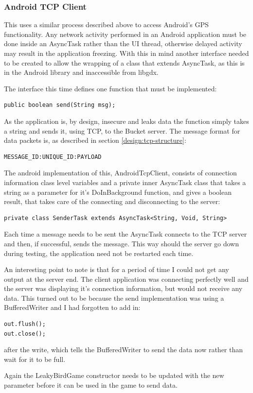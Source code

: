 \subsubsection{Android TCP Client}
This uses a similar process described above to access Android’s GPS functionality. Any network activity performed in an Android application must be done inside an AsyncTask rather than the UI thread, otherwise delayed activity may result in the application freezing. With this in mind another interface needed to be created to allow the wrapping of a class that extends AsyncTask, as this is in the Android library and inaccessible from libgdx.

The interface this time defines one function that must be implemented:
\begin{verbatim}
public boolean send(String msg);
\end{verbatim}

As the application is, by design, insecure and leaks data the function simply takes a string and sends it, using TCP, to the Bucket server. The message format for data packets is, as described in section \ref{design:tcp-structure}:
\begin{verbatim}
MESSAGE_ID:UNIQUE_ID:PAYLOAD
\end{verbatim}

The android implementation of this, AndroidTcpClient, consists of connection information class level variables and a private inner AsyncTask class that takes a string as a parameter for it’s DoInBackground function, and gives a boolean result, that takes care of the connecting and disconnecting to the server:

\begin{verbatim}
private class SenderTask extends AsyncTask<String, Void, String>
\end{verbatim}

Each time a message needs to be sent the AsyncTask connects to the TCP server and then, if successful, sends the message. This way should the server go down during testing, the application need not be restarted each time.
 
An interesting point to note is that for a period of time I could not get any output at the server end. The client application was connecting perfectly well and the server was displaying it’s connection information, but would not receive any data. This turned out to be because the send implementation was using a BufferedWriter and I had forgotten to add in:

\begin{verbatim}
out.flush();
out.close();
\end{verbatim}

after the write, which tells the BufferedWriter to send the data now rather than wait for it to be full.

Again the LeakyBirdGame constructor needs to be updated with the new parameter before it can be used in the game to send data.
\clearpage